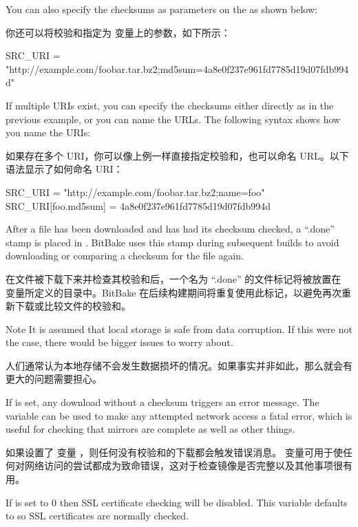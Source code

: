 You can also specify the checksums as parameters on the  as shown below:

你还可以将校验和指定为  变量上的参数，如下所示：

\begin{pyglist}
SRC_URI = "http://example.com/foobar.tar.bz2;md5sum=4a8e0f237e961fd7785d19d07fdb994d"
\end{pyglist}

If multiple URIs exist, you can specify the checksums either directly as in the previous example, or you can name the URLs. The following syntax shows how you name the URIs:

如果存在多个 URI，你可以像上例一样直接指定校验和，也可以命名 URL。以下语法显示了如何命名 URI：

\begin{pyglist}
SRC_URI = "http://example.com/foobar.tar.bz2;name=foo"
SRC_URI[foo.md5sum] = 4a8e0f237e961fd7785d19d07fdb994d
\end{pyglist}


After a file has been downloaded and has had its checksum checked, a ``.done'' stamp is placed in . BitBake uses this stamp during subsequent builds to avoid downloading or comparing a checksum for the file again.

在文件被下载下来并检查其校验和后，一个名为 ``.done'' 的文件标记将被放置在  变量所定义的目录中。BitBake 在后续构建期间将重复使用此标记，以避免再次重新下载或比较文件的校验和。

\medskip
\begin{noteblock}{Note}%
It is assumed that local storage is safe from data corruption. If this were not the case, there would be bigger issues to worry about.

\medskip
人们通常认为本地存储不会发生数据损坏的情况。如果事实并非如此，那么就会有更大的问题需要担心。
\end{noteblock}

If  is set, any download without a checksum triggers an error message. The  variable can be used to make any attempted network access a fatal error, which is useful for checking that mirrors are complete as well as other things.

如果设置了  变量 ，则任何没有校验和的下载都会触发错误消息。 变量可用于使任何对网络访问的尝试都成为致命错误，这对于检查镜像是否完整以及其他事项很有用。

If  is set to 0 then SSL certificate checking will be disabled. This variable defaults to  so SSL certificates are normally checked.

